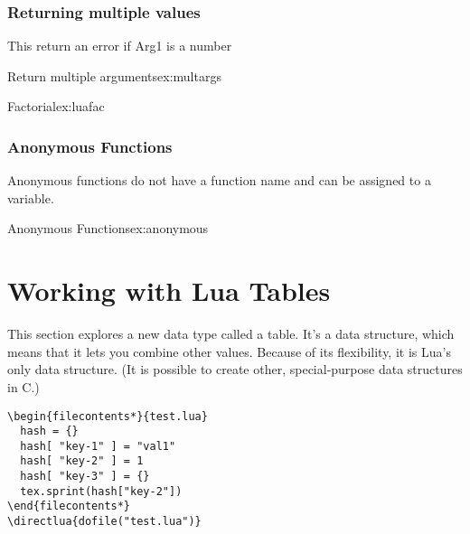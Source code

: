 \subsection{Returning multiple values}

This return an error if Arg1 is a number

\begin{texexample}{Return multiple arguments}{ex:multargs}
\end{texexample}


\begin{texexample}{Factorial}{ex:luafac}
\end{texexample}

\subsection{Anonymous Functions}

Anonymous functions do not have a function name and can be assigned to a variable. 

\begin{texexample}{Anonymous Functions}{ex:anonymous}
\end{texexample}

\chapter{Working with Lua Tables}

This section explores a new data type called a table. It's a data structure, which means that it lets
you combine other values. Because of its flexibility, it is Lua’s only data structure. (It is possible to
create other, special-purpose data structures in C.)
\begin{verbatim}
\begin{filecontents*}{test.lua}
  hash = {}
  hash[ "key-1" ] = "val1"
  hash[ "key-2" ] = 1
  hash[ "key-3" ] = {}
  tex.sprint(hash["key-2"])
\end{filecontents*}
\directlua{dofile("test.lua")}
\end{verbatim}


